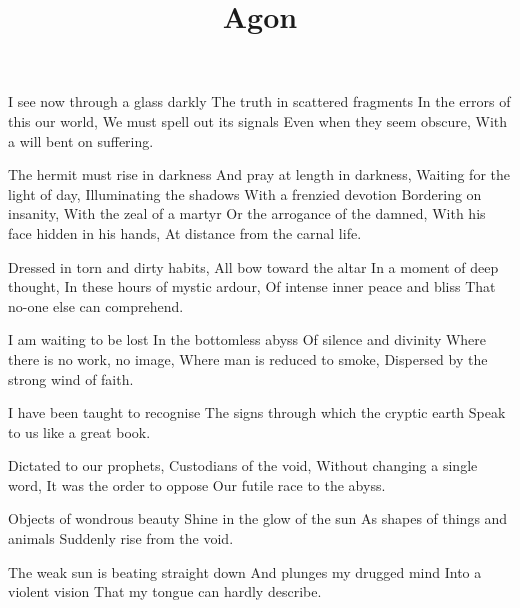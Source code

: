 \documentclass{article}
\title{Agon}
\newenvironment{stanza}{\begin{minipage}{10cm}\begin{internallinenumbers}\obeylines}{\end{internallinenumbers}\end{minipage}\vspace{\baselineskip}}
\begin{document}
\maketitle

\clearpage


\begin{stanza}
I see now through a glass darkly
The truth in scattered fragments
In the errors of this our world,
We must spell out its signals
Even when they seem obscure,
With a will bent on suffering.
\end{stanza}

\begin{stanza}
The hermit must rise in darkness
And pray at length in darkness,
Waiting for the light of day,
Illuminating the shadows
With a frenzied devotion
Bordering on insanity,
With the zeal of a martyr
Or the arrogance of the damned,
With his face hidden in his hands,
At distance from the carnal life.
\end{stanza}

\begin{stanza}
Dressed in torn and dirty habits,
All bow toward the altar
In a moment of deep thought,
In these hours of mystic ardour,
Of intense inner peace and bliss
That no-one else can comprehend.
\end{stanza}

\begin{stanza}
I am waiting to be lost
In the bottomless abyss
Of silence and divinity
Where there is no work, no image,
Where man is reduced to smoke,
Dispersed by the strong wind of faith.
\end{stanza}

\begin{stanza}
I have been taught to recognise
The signs through which the cryptic earth
Speak to us like a great book.
\end{stanza}

\begin{stanza}
Dictated to our prophets,
Custodians of the void,
Without changing a single word,
It was the order to oppose
Our futile race to the abyss.
\end{stanza}

\begin{stanza}
Objects of wondrous beauty
Shine in the glow of the sun
As shapes of things and animals
Suddenly rise from the void.
\end{stanza}

\begin{stanza}
The weak sun is beating straight down
And plunges my drugged mind
Into a violent vision
That my tongue can hardly describe.
\end{stanza}
\end{document}

